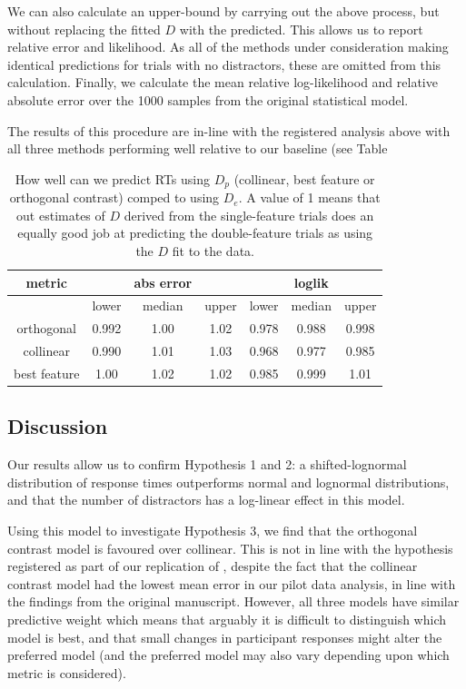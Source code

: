 \documentclass[preprint,12pt,authoryear]{elsarticle}
\begin{document}
We can also calculate an upper-bound by carrying out the above process, but without replacing the fitted $D$ with the predicted. This allows us to report relative error and likelihood. As all of the methods under consideration making identical predictions for trials with no distractors, these are omitted from this calculation. Finally, we calculate the mean relative log-likelihood and relative absolute error over the 1000 samples from the original statistical model. 

The results of this procedure are in-line with the registered analysis above with all three methods performing well relative to our baseline (see Table 

\begin{table}[h]
\centering
\begin{tabular}{c|ccc|ccc} 
\hline
metric & & abs error & &  & loglik  & \\
 \hline
  & lower  & median & upper & lower  & median & upper \\
 
orthogonal & 0.992 & 1.00 & 1.02 & 0.978 & 0.988 & 0.998\\
collinear & 0.990 & 1.01 & 1.03 & 0.968 & 0.977 & 0.985\\ 
best feature  & 1.00 & 1.02 & 1.02 & 0.985 & 0.999 & 1.01\\
 \end{tabular}
\caption{How well can we predict RTs using $D_p$ (collinear, best feature or orthogonal contrast) comped to using $D_e$. A value of 1 means that out estimates of $D$ derived from the single-feature trials does an equally good job at predicting the double-feature trials as using the $D$ fit to the data.}
\label{tab:new_pred_rt}
\end{table}





\subsection{Discussion}

Our results allow us to confirm Hypothesis 1 and 2: a shifted-lognormal distribution of response times outperforms normal and lognormal distributions, and that the number of distractors has a log-linear effect in this model. 

Using this model to investigate Hypothesis 3, we find that the orthogonal contrast model is favoured over collinear. This is not in line with the hypothesis registered as part of our replication of \cite{buetti2019predicting}, despite the fact that the collinear contrast model had the lowest mean error in our pilot data analysis, in line with the findings from the original manuscript. However, all three models have similar predictive weight which means that arguably it is difficult to distinguish which model is best, and that small changes in participant responses might alter the preferred model (and the preferred model may also vary depending upon which metric is considered).
\end{document}
